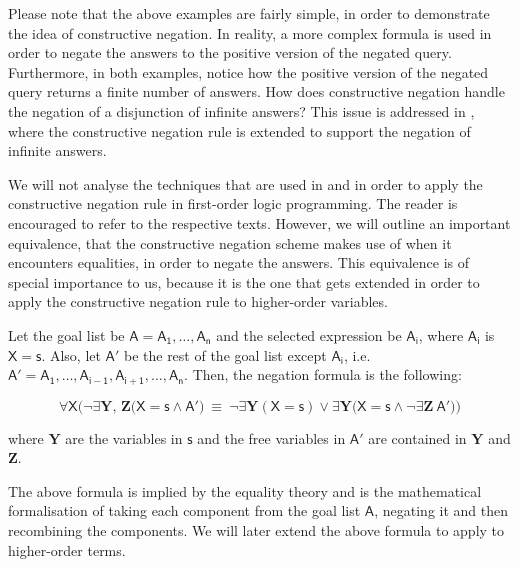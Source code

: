 \documentclass[inscr,ack,preface]{dithesis}
\theoremstyle{definition}
\newcommand{\msf}[1]{$\mathsf{#1}$}
\begin{document}
Please note that the above examples are fairly simple, in order to demonstrate the idea of constructive negation. In reality, a more complex formula is used in order to negate the answers to the positive version of the negated query. Furthermore, in both examples, notice how the positive version of the negated query returns a finite number of answers. How does constructive negation handle the negation of a disjunction of infinite answers? This issue is addressed in \cite{DBLP:conf/slp/Chan89}, where the constructive negation rule is extended to support the negation of infinite answers.

We will not analyse the techniques that are used in \cite{DBLP:conf/iclp/Chan88} and \cite{DBLP:conf/slp/Chan89} in order to apply the constructive negation rule in first-order logic programming. The reader is encouraged to refer to the respective texts. However, we will outline an important equivalence, that the constructive negation scheme makes use of when it encounters equalities, in order to negate the answers. This equivalence is of special importance to us, because it is the one that gets extended in order to apply the constructive negation rule to higher-order variables.

Let the goal list be \msf{A = A_1, \ldots, A_n} and the selected expression be \msf{A_i}, where \msf{A_i} is \msf{X=s}. Also, let \msf{A'} be the rest of the goal list except \msf{A_i}, i.e. \msf{A' = A_1, \ldots, A_{i-1}, A_{i+1}, \ldots, A_{n}}. Then, the negation formula is the following:

\begin{equation}\label{eq:cneg}
  \forall \mathsf{X} \Big(
    \lnot\exists \textbf{Y, Z} \big( \mathsf{X=s} \land \mathsf{A'} \big) ~\equiv~
    \lnot\exists \textbf{Y} \left(\mathsf{X=s}\right) \lor \exists \textbf{Y} \big( \mathsf{X=s} \land \lnot\exists \textbf{Z} ~ \mathsf{A'} \big)
  \Big)
\end{equation}

where \msf{\textbf{Y}} are the variables in \msf{s} and the free variables in \msf{A'} are contained in \msf{\textbf{Y}} and \msf{\textbf{Z}}.

The above formula is implied by the equality theory and is the mathematical formalisation of taking each component from the goal list \msf{A}, negating it and then recombining the components. We will later extend the above formula to apply to higher-order terms.
\end{document}
